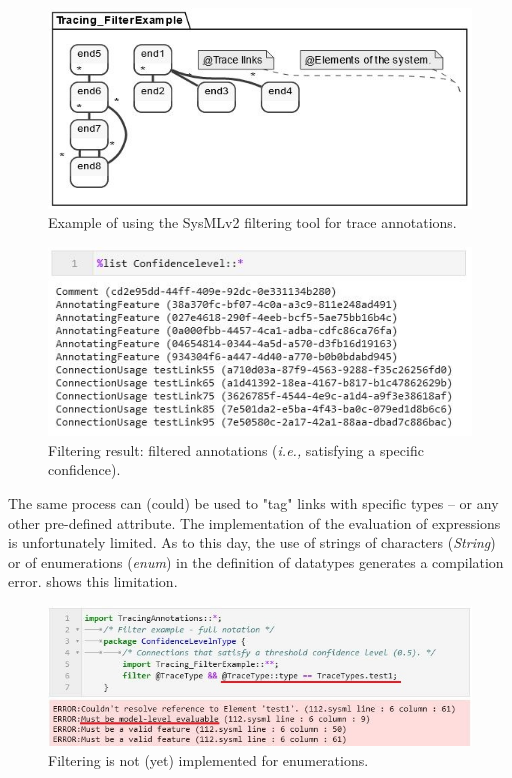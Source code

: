 \begin{figure}[ht]     
	\centering
	\includegraphics[width=.9\linewidth]{images/viz_filterexample.JPG}
	\caption{Example of using the SysMLv2 filtering tool for trace annotations.}
	\label{fig:vizfilter}
\end{figure} 

\begin{figure}[ht]     
	\centering
	\includegraphics[width=.75\linewidth]{images/viz_filterexample_res.JPG}
	\caption{Filtering result: filtered annotations (\textit{i.e.,} satisfying a specific confidence).}
	\label{fig:vizfilterres}
\end{figure} 



The same process can (could) be used to "tag" links with specific types -- or any other pre-defined attribute. The implementation of the evaluation of expressions is unfortunately limited. As to this day, the use of strings of characters (\textit{String}) or of enumerations (\textit{enum}) in the definition of datatypes generates a compilation error.  shows this limitation.

\begin{figure}[ht]     
	\centering
	\includegraphics[width=.9\linewidth]{images/viz_filterexample_err.JPG}
	\caption{Filtering is not (yet) implemented for enumerations.}
	\label{fig:vizfiltererr}
\end{figure} 

